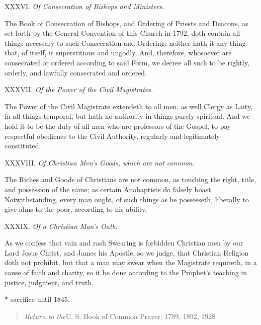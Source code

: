 XXXVI. \emph{Of Consecration of Bishops and Ministers.}

The Book of Consecration of Bishops, and Ordering of
Priests and Deacons, as set forth by the General Convention of this Church
in 1792, doth contain all things necessary to such Consecration and Ordering;
neither hath it any thing that, of itself, is superstitious and ungodly.
And, therefore, whosoever are consecrated or ordered according to said
Form, we decree all such to be rightly, orderly, and lawfully consecrated
and ordered.

XXXVII. \emph{Of the Power of the Civil Magistrates.}

The Power of the Civil Magistrate extendeth to all men,
as well Clergy as Laity, in all things temporal; but hath no authority
in things purely spiritual. And we hold it to be the duty of all men who
are professors of the Gospel, to pay respectful obedience to the Civil
Authority, regularly and legitimately constituted.

XXXVIII. \emph{Of Christian Men’s Goods, which are
not common.}

The Riches and Goods of Christians are not common, as
touching the right, title, and possession of the same; as certain Anabaptists
do falsely boast. Notwithstanding, every man ought, of such things as
he possesseth, liberally to give alms to the poor, according to his ability.

XXXIX. \emph{Of a Christian Man’s Oath.}

As we confess that vain and rash Swearing is forbidden
Christian men by our Lord Jesus Christ, and James his Apostle, so we judge,
that Christian Religion doth not prohibit, but that a man may swear when
the Magistrate requireth, in a cause of faith and charity, so it be done
according to the Prophet’s teaching in justice, judgment, and truth.

* sacrifice
until
1845.

\begin{quote}

\emph{Return to the}U.
S. Book of Common Prayer: 1789, 1892,
1928

\end{quote}
